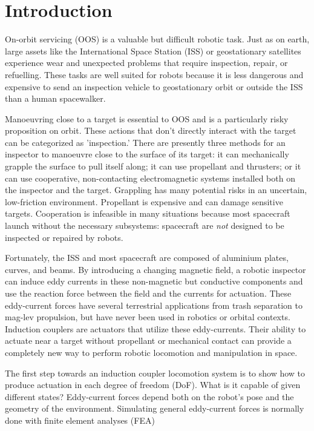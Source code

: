 \documentclass[letterpaper, 10 pt, conference]{ieeeconf}  %
\begin{document}
\section{Introduction}
On-orbit servicing (OOS)\label{def:OOS} is a valuable but difficult robotic task\cite{Coleshill2009}\cite{Ellery2004}\cite{Ellery2008}. Just as on earth, large assets like the International Space Station (ISS) \label{def:ISS} or geostationary satellites experience wear and unexpected problems that require inspection, repair, or refuelling\cite{Moosavian2007}\cite{Saleh2002}. These tasks are well suited for robots because it is less dangerous and expensive to send an inspection vehicle to geostationary orbit or outside the ISS than a human spacewalker\cite{Ambrose2012}. 
%
\par Manoeuvring close to a target is essential to OOS and is a particularly risky proposition on orbit. 
These actions that don't directly interact with the target can be categorized as 'inspection.' 
There are presently three methods for an inspector to manoeuvre close to the surface of its target: it can mechanically grapple the surface to pull itself along; it can use propellant and thrusters; or it can use cooperative, non-contacting electromagnetic systems installed both on the inspector and the target. Grappling has many potential risks in an uncertain, low-friction environment\cite{Nguyen-Huynh2011}. Propellant is expensive and can damage sensitive targets\cite{Markelov2012}. Cooperation is infeasible in many situations because most spacecraft launch without the necessary subsystems: spacecraft are \textit{not} designed to be inspected or repaired by robots.
%
\par Fortunately, the ISS and most spacecraft are composed of aluminium plates, curves, and beams. By introducing a changing magnetic field, a robotic inspector can induce eddy currents in these non-magnetic but conductive components and use the reaction force between the field and the currents for actuation\cite{Smyth1989}. These eddy-current forces have several terrestrial applications from trash separation \cite{Rem1997} to mag-lev propulsion,\cite{Paudel2012a}\cite{Ohji2007} but have never been used in robotics or orbital contexts. Induction couplers are actuators that utilize these eddy-currents. Their ability to actuate near a target without propellant or mechanical contact can provide a completely new way to perform robotic locomotion and manipulation in space.    
%
\par The first step towards an induction coupler locomotion system is to show how to produce actuation in each degree of freedom (DoF)\label{def:dof}. What is it capable of given different states? Eddy-current forces depend both on the robot's pose and the geometry of the environment. Simulating general eddy-current forces is normally done with finite element analyses (FEA)\label{def:fea} 
\end{document}
